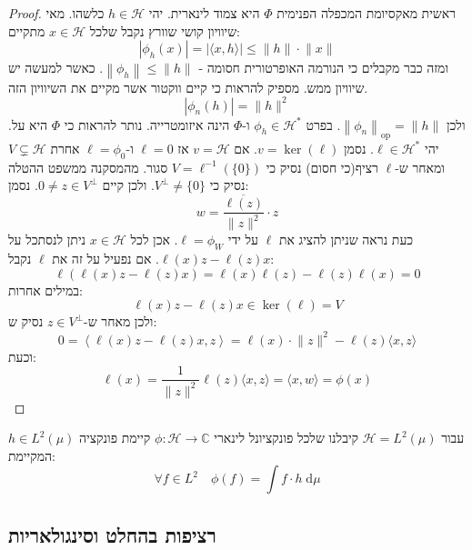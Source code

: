 \documentclass{tstextbook}
\begin{document}
\begin{proof}
ראשית מאקסיומת המכפלה הפנימית \(\Phi\) היא צמוד לינארית. יהי \(h \in \mathcal{H}\) כלשהו. מאי שיוויון קושי שוורץ נקבל שלכל \(x \in \mathcal{H}\) מתקיים:
$$\left\lvert  \phi_{h}(x)  \right\rvert =\left\lvert  \langle x,h \rangle   \right\rvert \leq \lVert h \rVert \cdot \lVert x \rVert $$
ומזה כבר מקבלים כי הנורמה האופרטורית חסומה - \(\left\lVert  \phi_{h}  \right\rVert\leq \lVert h \rVert\). כאשר למעשה יש שיוויון ממש. מספיק להראות כי קיים ווקטור אשר מקיים את השיוויון הזה. 
$$\left\lvert  \phi_{n}(h)  \right\rvert =\lVert h \rVert ^{2}$$
ולכן \(\left\lVert  \phi_{n}  \right\rVert_{\mathrm{op}}=\lVert h \rVert\). בפרט \(\phi_{h}\in \mathcal{H}^{*}\) ו-\(\Phi\) הינה איזומטרייה. נותר להראות כי \(\Phi\) היא על. 
יהי \(\ell \in \mathcal{H}^{*}\). נסמן \(v=\ker\left( \ell \right)\). אם \(v = \mathcal{H}\) אז \(\ell=0\) ו-\(\ell=\phi_{0}\) אחרת \(V\subsetneq \mathcal{H}\) ומאחר ש-\(\ell\) רציף(כי חסום) נסיק כי \(V= \ell^{-1}\left( \{ 0 \} \right)\) סגור.
מהמסקנה ממשפט ההטלה נסיק כי \(V^{\perp}\neq \{ 0 \}\). ולכן קיים \(0\neq z \in V^{\perp}\). נסמן:
$$w=\frac{\overline{\ell(z)}}{\lVert z \rVert ^{2}}\cdot z $$
כעת נראה שניתן להציג את \(\ell\) על ידי \(\ell=\phi_{W}\). אכן לכל \(x \in \mathcal{H}\) ניתן לנסתכל על \(\ell(x)z-\ell(z)x\). אם נפעיל על זה את \(\ell\) נקבל:
$$\ell\left( \ell(x)z-\ell(z)x \right)=\ell(x)\ell(z)-\ell(z)\ell(x)=0$$
במילים אחרות:
$$\ell(x)z-\ell(z)x \in \ker \left( \ell \right)=V$$
ולכן מאחר ש-\(z \in V^{\perp}\) נסיק ש:
$$0=\left\langle  \ell(x)z-\ell(z)x,z  \right\rangle =\ell(x)\cdot \lVert z \rVert ^{2}-\ell(z)\langle x,z \rangle $$
וכעת:
$$\ell(x)= \frac{1}{\lVert z \rVert ^{2}}\ell(z)\langle x,z \rangle =\langle x,w \rangle =\phi(x)$$

\end{proof}
\begin{corollary}
עבור \(\mathcal{H}=L^{2}\left( \mu \right)\) קיבלנו שלכל פונקציונל לינארי \(\phi:\mathcal{H}\to \mathbb{C}\)  קיימת פונקציה \(h \in L^{2}\left( \mu \right)\) המקיימת:
$$\forall f \in L^{2}\quad \phi(f)=\int f\cdot h \;\mathrm{d} \mu $$

\end{corollary}
\subsection{רציפות בהחלט וסינגולאריות}
\end{document}
